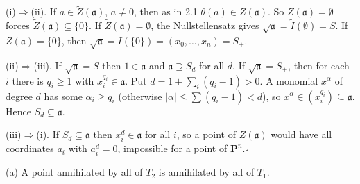\documentclass[11pt]{article}
\begin{document}
\pf
(i)$\Rightarrow$(ii). If $a\in\widetilde Z(\mathfrak a)$, $a\ne0$, then as in 2.1 $\theta(a)\in Z(\mathfrak a)$. So $Z(\mathfrak a)=\emptyset$ forces $\widetilde Z(\mathfrak a)\subseteq\{0\}$. If $\widetilde Z(\mathfrak a)=\emptyset$, the Nullstellensatz gives $\sqrt{\mathfrak a}=\widetilde I(\emptyset)=S$. If $\widetilde Z(\mathfrak a)=\{0\}$, then $\sqrt{\mathfrak a}=\widetilde I(\{0\})=(x_0,\dots,x_n)=S_+$.

(ii)$\Rightarrow$(iii). If $\sqrt{\mathfrak a}=S$ then $1\in\mathfrak a$ and $\mathfrak a\supseteq S_d$ for all $d$. If $\sqrt{\mathfrak a}=S_+$, then for each $i$ there is $q_i\ge1$ with $x_i^{q_i}\in\mathfrak a$. Put $d=1+\sum_i(q_i-1)>0$. A monomial $x^\alpha$ of degree $d$ has some $\alpha_i\ge q_i$ (otherwise $|\alpha|\le\sum(q_i-1)<d$), so $x^\alpha\in(x_i^{q_i})\subseteq\mathfrak a$. Hence $S_d\subseteq\mathfrak a$.

(iii)$\Rightarrow$(i). If $S_d\subseteq\mathfrak a$ then $x_i^d\in\mathfrak a$ for all $i$, so a point of $Z(\mathfrak a)$ would have all coordinates $a_i$ with $a_i^d=0$, impossible for a point of $\mathbf P^n$.\hfill$\square$

\pf
(a) A point annihilated by all of $T_2$ is annihilated by all of $T_1$.
\end{document}
